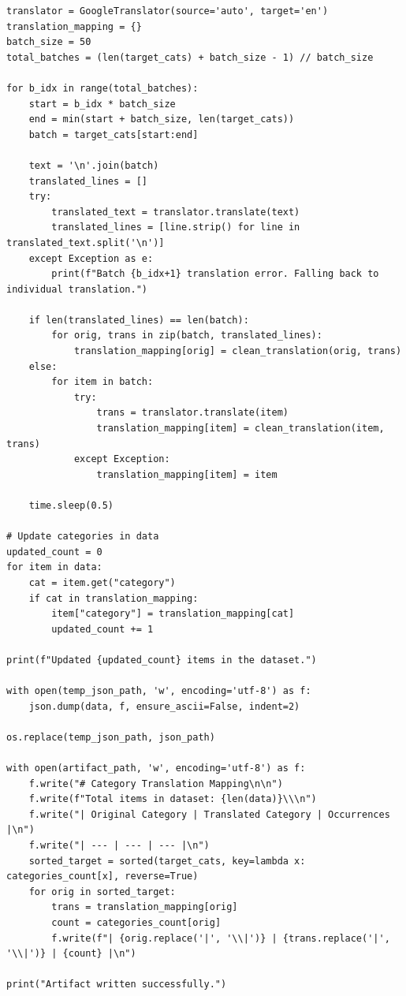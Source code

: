 \documentclass[11pt]{article}
\begin{document}
\begin{lstlisting}[style=pythoncode, caption={translate\_categories.py}]
translator = GoogleTranslator(source='auto', target='en')
translation_mapping = {}
batch_size = 50
total_batches = (len(target_cats) + batch_size - 1) // batch_size

for b_idx in range(total_batches):
    start = b_idx * batch_size
    end = min(start + batch_size, len(target_cats))
    batch = target_cats[start:end]
    
    text = '\n'.join(batch)
    translated_lines = []
    try:
        translated_text = translator.translate(text)
        translated_lines = [line.strip() for line in translated_text.split('\n')]
    except Exception as e:
        print(f"Batch {b_idx+1} translation error. Falling back to individual translation.")
        
    if len(translated_lines) == len(batch):
        for orig, trans in zip(batch, translated_lines):
            translation_mapping[orig] = clean_translation(orig, trans)
    else:
        for item in batch:
            try:
                trans = translator.translate(item)
                translation_mapping[item] = clean_translation(item, trans)
            except Exception:
                translation_mapping[item] = item
                
    time.sleep(0.5)

# Update categories in data
updated_count = 0
for item in data:
    cat = item.get("category")
    if cat in translation_mapping:
        item["category"] = translation_mapping[cat]
        updated_count += 1

print(f"Updated {updated_count} items in the dataset.")

with open(temp_json_path, 'w', encoding='utf-8') as f:
    json.dump(data, f, ensure_ascii=False, indent=2)

os.replace(temp_json_path, json_path)

with open(artifact_path, 'w', encoding='utf-8') as f:
    f.write("# Category Translation Mapping\n\n")
    f.write(f"Total items in dataset: {len(data)}\\\n")
    f.write("| Original Category | Translated Category | Occurrences |\n")
    f.write("| --- | --- | --- |\n")
    sorted_target = sorted(target_cats, key=lambda x: categories_count[x], reverse=True)
    for orig in sorted_target:
        trans = translation_mapping[orig]
        count = categories_count[orig]
        f.write(f"| {orig.replace('|', '\\|')} | {trans.replace('|', '\\|')} | {count} |\n")

print("Artifact written successfully.")
\end{lstlisting}
\end{document}
